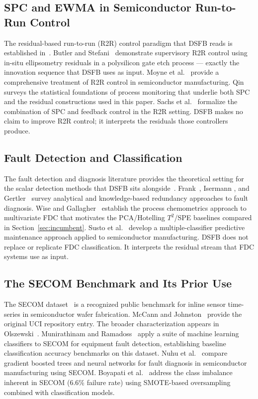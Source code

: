 \documentclass[11pt,letterpaper]{article}
\theoremstyle{scresult}
\begin{document}
\subsection{SPC and EWMA in Semiconductor Run-to-Run Control}

The residual-based run-to-run (R2R) control paradigm that DSFB reads is
established in~\cite{ewma_r2r,moyne2000,qin2003,sachs1995}. Butler and
Stefani~\cite{ewma_r2r} demonstrate supervisory R2R control using in-situ
ellipsometry residuals in a polysilicon gate etch process --- exactly the
innovation sequence that DSFB uses as input. Moyne et
al.~\cite{moyne2000} provide a comprehensive treatment of R2R control in
semiconductor manufacturing. Qin~\cite{qin2003} surveys the statistical
foundations of process monitoring that underlie both SPC and the residual
constructions used in this paper. Sachs et al.~\cite{sachs1995} formalize the
combination of SPC and feedback control in the R2R setting. DSFB makes no
claim to improve R2R control; it interprets the residuals those controllers
produce.

\subsection{Fault Detection and Classification}

The fault detection and diagnosis literature provides the theoretical setting
for the scalar detection methods that DSFB sits alongside~\cite{frank1990,
isermann2005,gertler1998,pca_fdc,susto2015}. Frank~\cite{frank1990}, Isermann
\cite{isermann2005}, and Gertler~\cite{gertler1998} survey analytical and
knowledge-based redundancy approaches to fault diagnosis. Wise and
Gallagher~\cite{pca_fdc} establish the process chemometrics approach to
multivariate FDC that motivates the PCA/Hotelling $T^2$/SPE baselines compared
in Section~\ref{sec:incumbent}. Susto et al.~\cite{susto2015} develop a
multiple-classifier predictive maintenance approach applied to semiconductor
manufacturing. DSFB does not replace or replicate FDC classification. It
interprets the residual stream that FDC systems use as input.

\subsection{The SECOM Benchmark and Its Prior Use}

The SECOM dataset~\cite{secom,mccann2008} is a recognized public benchmark for
inline sensor time-series in semiconductor wafer fabrication. McCann and
Johnston~\cite{mccann2008} provide the original UCI repository entry. The
broader characterization appears in Olszewski~\cite{secom}.
Munirathinam and Ramadoss~\cite{munirathinam2016} apply a suite of machine
learning classifiers to SECOM for equipment fault detection, establishing
baseline classification accuracy benchmarks on this dataset.
Nuhu et al.~\cite{nuhu2023} compare gradient boosted trees and neural networks
for fault diagnosis in semiconductor manufacturing using SECOM.
Boyapati et al.~\cite{boyapati2024} address the class imbalance inherent in
SECOM (6.6\% failure rate) using SMOTE-based oversampling combined with
classification models.
\end{document}
